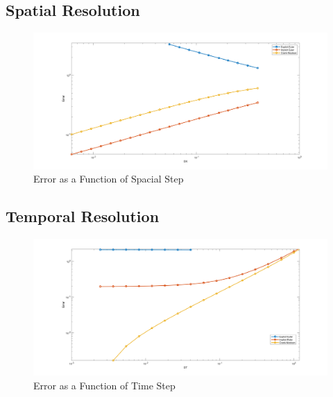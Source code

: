 \documentclass[10pt, letter, showtrims]{extarticle}
\begin{document}
		\FloatBarrier
		
		\pagebreak
		
		\subsection{Spatial Resolution}
		
		\FloatBarrier
		\begin{figure}[h]
			\centering
			\captionsetup{justification=centering}
			\includegraphics[width=\linewidth]{"Figures/MATLAB/ConstantDTSource"}
			\caption{Error as a Function of Spacial Step}
			\label{fig:explicit}
		\end{figure}		
		\FloatBarrier
		
		\pagebreak
		
		\subsection{Temporal Resolution}
		
		\FloatBarrier
		\begin{figure}[h]
			\centering
			\captionsetup{justification=centering}
			\includegraphics[width=\linewidth]{"Figures/MATLAB/ConstantDXSource"}
			\caption{Error as a Function of Time Step}
			\label{fig:explicit}
		\end{figure}		
		\FloatBarrier
		
\end{document}

